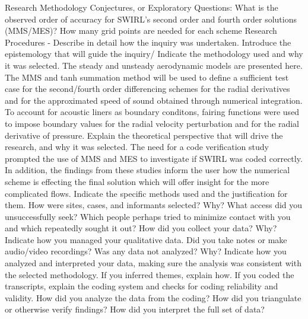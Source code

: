 \documentclass[a4paper]{report}
\begin{document}
\begin{outline}[enumerate]
    \1 Research Methodology
    \2 Conjectures, or Exploratory Questions:
    \2[-] What is the observed order of accuracy for SWIRL's second order and 
    fourth order solutions (MMS/MES)? How many grid points are needed for each scheme
    \2 Research Procedures - Describe in detail how the inquiry was undertaken.
    \3 Introduce the epistemology that will guide the inquiry/
    Indicate the methodology used and why it was selected.
    \4 The steady and unsteady aerodynamic models are presented here.
    \4 The MMS and tanh summation method will be used to define a sufficient test 
    case for the second/fourth order differencing schemes for the radial derivatives
    and for the approximated speed of sound obtained through numerical integration. To account 
    for acoustic liners as boundary conditons, fairing functions were used
    to impose boundary values for the radial velocity perturbation and for the 
    radial derivative of pressure.
    \3 Explain the theoretical perspective that will drive the research, and why it was selected. 
    \4 The need for a code verification study prompted the use of MMS and MES to
    investigate if SWIRL was coded correctly. In addition, the findings from these 
    studies inform the user how the numerical scheme is effecting the final solution which
    will offer insight for the more complicated flows.
    \3 Indicate the specific methods used and the justification for them. How were sites, cases, and
    informants selected? Why? What access did you unsuccessfully seek? Which people perhaps tried to
    minimize contact with you and which repeatedly sought it out? How did you collect your data? Why?
    \3 Indicate how you managed your qualitative data. Did you take notes or make audio/video
    recordings? Was any data not analyzed? Why?
    \3 Indicate how you analyzed and interpreted your data, making sure the analysis was consistent with
    the selected methodology. If you inferred themes, explain how. If you coded the transcripts, explain
    the coding system and checks for coding reliability and validity. How did you analyze the data from
    the coding? How did you triangulate or otherwise verify findings? How did you interpret the full set
    of data?


\end{outline}
\end{document}
